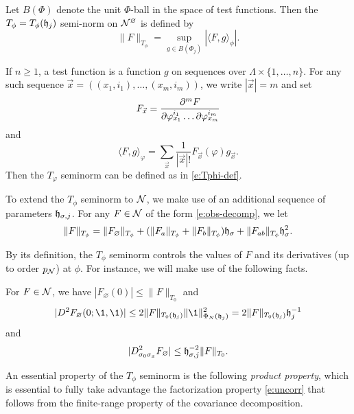 Let $B(\Phi)$ denote the unit $\Phi$-ball in the space of test functions. Then the
$T_\phi = T_\phi(\mathfrak{h}_j)$ semi-norm on $\mathcal{N}^\varnothing$ is defined by
\begin{equation}
\label{e:Tphi-def}
\|F\|_{T_\phi} = \sup_{g\in B(\Phi_j)} |\langle F, g \rangle_\phi|.
\end{equation}

\begin{rk}
\label{rk:Tphi-n}
If $n \ge 1$, a test function is a function $g$ on sequences over $\Lambda\times\{1,\ldots,n\}$.
For any such sequence $\vec x = ((x_1, i_1), \ldots, (x_m, i_m))$, we write $|\vec x| = m$
and set
\begin{equation}
F_{\vec x}
	=
\frac{\partial ^m F}{\partial \varphi^{i_1}_{x_1} \ldots \partial\varphi^{i_m}_{x_m}}
\end{equation}
and
\begin{equation}
\langle F, g \rangle_\varphi
	=
\sum_{\vec x} \frac{1}{|\vec x|!} F_{\vec x}(\varphi) g_{\vec x}.
\end{equation}
Then the $T_\varphi$ seminorm can be defined as in \eqref{e:Tphi-def}.
\end{rk}

To extend the $T_\phi$ seminorm to $\mathcal{N}$, we make use of an additional sequence
of parameters $\mathfrak{h}_{\sigma,j}$. For any $F \in \mathcal{N}$ of the form \eqref{e:obs-decomp},
we let
\begin{equation}
\|F\|_{T_\phi}
	=
\|F_\varnothing\|_{T_\phi}
	+ (\|F_a\|_{T_\phi} + \|F_b\|_{T_\phi}) \mathfrak{h}_\sigma
	+ \|F_{ab}\|_{T_\phi} \mathfrak{h}_\sigma^2.
\end{equation}

By its definition, the $T_\phi$ seminorm controls the values of $F$ and its derivatives
(up to order $p_{\mathcal{N}}$) at $\phi$. For instance, we will make use of the following facts.

\begin{lemma}
\label{lem:deriv-norm-bds}
For $F \in \mathcal{N}$, we have $|F_\varnothing(0)| \le \|F\|_{T_0}$ and
\begin{equation}
\label{e:deriv-norm-bd}
|D^2 F_\varnothing(0; \1, \1)|
	\le
2 \|F\|_{T_0(\h_j)} \|\1\|^2_{\Phi_N(\h_j)}
	=
2 \|F\|_{T_0(\h_j)} \h_j^{-1}
\end{equation}
and
\begin{equation}
|D^2_{\sigma_0\sigma_x} F_\varnothing|
	\le
\mathfrak{h}_{\sigma,j}^{-2} \|F\|_{T_0}.
\end{equation}
\end{lemma}

An essential property of the $T_\phi$ seminorm is the following \emph{product property},
which is essential to fully take advantage the factorization property \eqref{e:uncorr}
that follows from the finite-range property of the covariance decomposition.

